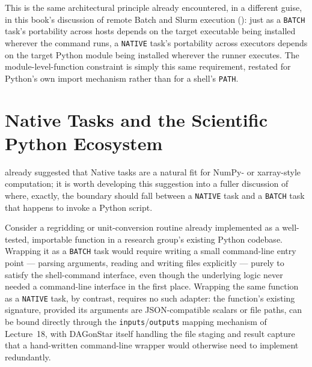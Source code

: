 \begin{practicebox}
This is the same architectural principle already encountered, in a
different guise, in this book's discussion of remote Batch and Slurm
execution (): just as a \texttt{BATCH} task's portability
across hosts depends on the target executable being installed wherever the
command runs, a \texttt{NATIVE} task's portability across executors depends
on the target Python module being installed wherever the runner executes.
The module-level-function constraint is simply this same requirement,
restated for Python's own import mechanism rather than for a shell's
\texttt{PATH}.
\end{practicebox}

\section{Native Tasks and the Scientific Python Ecosystem}

 already suggested that Native tasks are a natural fit
for NumPy- or xarray-style computation; it is worth developing this
suggestion into a fuller discussion of where, exactly, the boundary should
fall between a \texttt{NATIVE} task and a \texttt{BATCH} task that happens
to invoke a Python script.

Consider a regridding or unit-conversion routine already implemented as a
well-tested, importable function in a research group's existing Python
codebase. Wrapping it as a \texttt{BATCH} task would require writing a
small command-line entry point --- parsing arguments, reading and writing
files explicitly --- purely to satisfy the shell-command interface, even
though the underlying logic never needed a command-line interface in the
first place. Wrapping the same function as a \texttt{NATIVE} task, by
contrast, requires no such adapter: the function's existing signature,
provided its arguments are JSON-compatible scalars or file paths, can be
bound directly through the \texttt{inputs}/\texttt{outputs} mapping
mechanism of Lecture~18, with DAGonStar itself handling the file staging and
result capture that a hand-written command-line wrapper would otherwise
need to implement redundantly.

